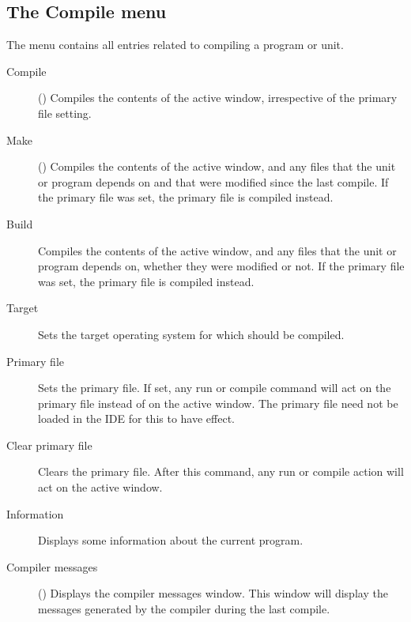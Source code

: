 \subsection{The Compile menu}
\label{se:menucompile}
The  menu contains all entries related to compiling a program or
unit.
\begin{description}
\item[Compile] () Compiles the contents of the active window,
irrespective of the primary file setting.
\item[Make] () Compiles the contents of the active window, and
any files that the unit or program depends on and that were modified since
the last compile.
If the primary file was set, the primary file is compiled instead.
\item[Build]
Compiles the contents of the active window, and any files that the unit or
program depends on, whether they were modified or not.
If the primary file was set, the primary file is compiled instead.
\item[Target] Sets the target operating system for which should be compiled.
\item[Primary file] Sets the primary file. If set, any run or compile command
will act on the primary file instead of on the active window. The primary
file need not be loaded in the IDE for this to have effect.
\item[Clear primary file]
Clears the primary file. After this command, any run or compile action will
act on the active window.
\item[Information] Displays some information about the current program.
\item[Compiler messages] () Displays the compiler messages
window. This window will display the messages generated by the compiler
during the last compile.
\end{description}
%
%
